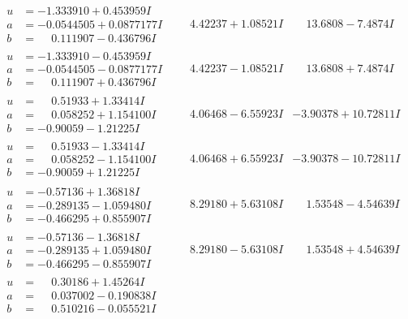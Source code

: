 \documentclass[1p]{elsarticle_modified}
\theoremstyle{definition}
\begin{document}
$$\begin{array}{c|c|c}
\begin{aligned}
u &= -1.333910 + 0.453959 I \\
a &= -0.0544505 + 0.0877177 I \\
b &= \phantom{-}0.111907 - 0.436796 I\end{aligned}
 & \phantom{-}4.42237 + 1.08521 I & \phantom{-}13.6808 - 7.4874 I \\ \hline\begin{aligned}
u &= -1.333910 - 0.453959 I \\
a &= -0.0544505 - 0.0877177 I \\
b &= \phantom{-}0.111907 + 0.436796 I\end{aligned}
 & \phantom{-}4.42237 - 1.08521 I & \phantom{-}13.6808 + 7.4874 I \\ \hline\begin{aligned}
u &= \phantom{-}0.51933 + 1.33414 I \\
a &= \phantom{-}0.058252 + 1.154100 I \\
b &= -0.90059 - 1.21225 I\end{aligned}
 & \phantom{-}4.06468 - 6.55923 I & -3.90378 + 10.72811 I \\ \hline\begin{aligned}
u &= \phantom{-}0.51933 - 1.33414 I \\
a &= \phantom{-}0.058252 - 1.154100 I \\
b &= -0.90059 + 1.21225 I\end{aligned}
 & \phantom{-}4.06468 + 6.55923 I & -3.90378 - 10.72811 I \\ \hline\begin{aligned}
u &= -0.57136 + 1.36818 I \\
a &= -0.289135 - 1.059480 I \\
b &= -0.466295 + 0.855907 I\end{aligned}
 & \phantom{-}8.29180 + 5.63108 I & \phantom{-}1.53548 - 4.54639 I \\ \hline\begin{aligned}
u &= -0.57136 - 1.36818 I \\
a &= -0.289135 + 1.059480 I \\
b &= -0.466295 - 0.855907 I\end{aligned}
 & \phantom{-}8.29180 - 5.63108 I & \phantom{-}1.53548 + 4.54639 I \\ \hline\begin{aligned}
u &= \phantom{-}0.30186 + 1.45264 I \\
a &= \phantom{-}0.037002 - 0.190838 I \\
b &= \phantom{-}0.510216 - 0.055521 I\end{aligned}

\end{array}$$
\end{document}
